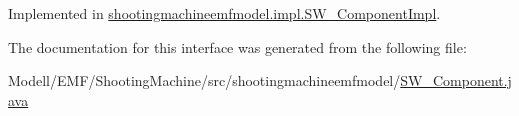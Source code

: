 Implemented in \hyperlink{classshootingmachineemfmodel_1_1impl_1_1_s_w___component_impl_afb6ead0797fbb25059fe4a7a507cfb3e}{shootingmachineemfmodel.\-impl.\-S\-W\-\_\-\-Component\-Impl}.



The documentation for this interface was generated from the following file\-:\begin{DoxyCompactItemize}
\item 
Modell/\-E\-M\-F/\-Shooting\-Machine/src/shootingmachineemfmodel/\hyperlink{_s_w___component_8java}{S\-W\-\_\-\-Component.\-java}\end{DoxyCompactItemize}
